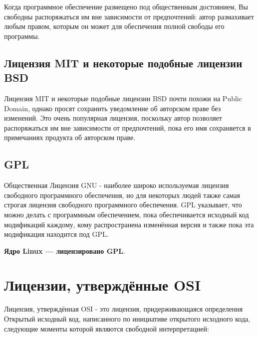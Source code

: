\documentclass[10pt]{book}
\begin{document}
\vspace{-4mm}

Когда программное обеспечение размещено под общественным достоянием, Вы свободны  распоряжаться им вне зависимости от предпочтений: автор размахивает любым правом, которым он может для обеспечения полной свободы его программы.

\subsection{Лицензия MIT и некоторые подобные лицензии  BSD}


\vspace{-4mm}

Лицензия MIT и некоторые подобные лицензии BSD почти похожи на Public Domain, однако просят сохранить уведомление об авторском праве без изменений. Это очень популярная лицензия, поскольку автор позволяет распоряжаться им вне зависимости от предпочтений, пока его имя сохраняется в примечаниях продукта об авторском праве.

\subsection{GPL}


\vspace{-4mm}

Общественная Лицензия GNU - наиболее широко используемая лицензия свободного программного обеспечения, но для некоторых людей также самая строгая лицензия свободного программного обеспечения. GPL указывает, что можно делать с программным обеспечением, пока обеспечивается исходный код модификаций каждому, кому распространена изменённая версия и также пока эта модификация находится под GPL.

\textbf{Ядро Linux --- лицензировано GPL}.

\section{Лицензии, утверждённые OSI}

Лицензия, утверждённая OSI - это лицензия, придерживающаяся определения Открытый исходный код, написанного по инициативе открытого исходного кода, следующие моменты которой являются свободной интерпретацией:
\end{document}
